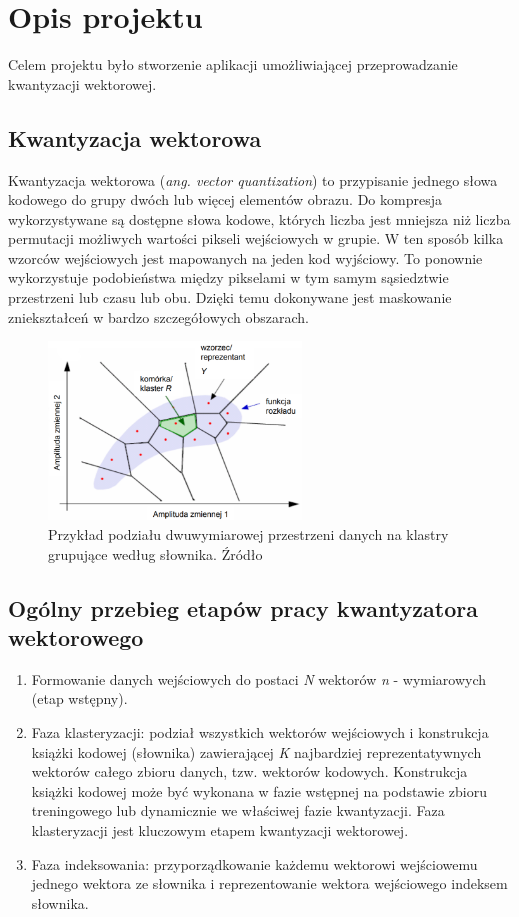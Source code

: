 \documentclass{article}
\begin{document}
\section{Opis projektu}

Celem projektu było stworzenie aplikacji umożliwiającej przeprowadzanie kwantyzacji wektorowej.

\subsection{Kwantyzacja wektorowa}
Kwantyzacja wektorowa (\textit{ang. vector quantization}) to przypisanie jednego słowa kodowego do grupy dwóch lub więcej elementów obrazu. Do kompresja wykorzystywane są dostępne słowa kodowe, których liczba jest mniejsza niż liczba permutacji możliwych wartości pikseli wejściowych w grupie. W ten sposób kilka wzorców wejściowych jest mapowanych na jeden kod wyjściowy. To ponownie wykorzystuje podobieństwa między pikselami w tym samym sąsiedztwie przestrzeni lub czasu lub obu. Dzięki temu dokonywane jest maskowanie zniekształceń w bardzo szczegółowych obszarach.
\begin{figure}[H]
    \centering
    \includegraphics[width=0.6\textwidth]{images/kwantyzacja_wektorowa.png}
    \caption{Przykład podziału dwuwymiarowej przestrzeni danych na klastry grupujące według słownika. Źródło \cite{mwilczewski}}
    \label{fig:crossing}
\end{figure}

\subsection{Ogólny przebieg etapów pracy kwantyzatora wektorowego}

\begin{enumerate}
  \item Formowanie danych wejściowych do postaci \textit{N} wektorów \textit{n} - wymiarowych (etap wstępny). 
  \item Faza klasteryzacji: podział wszystkich wektorów wejściowych i konstrukcja książki kodowej (słownika) zawierającej \textit{K} najbardziej reprezentatywnych wektorów całego zbioru danych, tzw. wektorów kodowych. Konstrukcja książki kodowej może być wykonana w fazie wstępnej na podstawie zbioru treningowego lub dynamicznie we właściwej fazie kwantyzacji. Faza klasteryzacji jest kluczowym etapem kwantyzacji wektorowej.
  \item Faza indeksowania: przyporządkowanie każdemu wektorowi wejściowemu jednego wektora ze słownika i reprezentowanie wektora wejściowego indeksem słownika. 
\end{enumerate}
\end{document}
